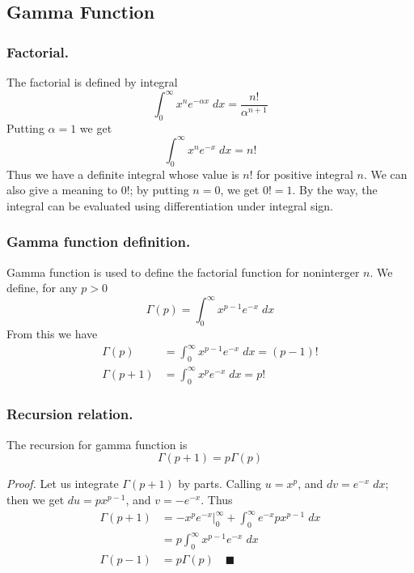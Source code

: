 \documentclass[../main.tex]{subfiles}
\begin{document}
\subsection*{Gamma Function}
\subsubsection*{Factorial.} The factorial is defined by integral
\begin{equation*}
    \int_{0}^{\infty} x^ne^{-\alpha x}\;dx=\frac{n!}{\alpha^{n+1}}
\end{equation*}
Putting $\alpha=1$ we get 
\begin{equation*}
    \int_{0}^{\infty} x^ne^{-x}\;dx=n!
\end{equation*}
Thus we have a definite integral whose value is $n!$ for positive integral $n$. We can also give a meaning to $0!$; by putting $n=0$, we get $0!=1$. By the way, the integral can be evaluated using differentiation under integral sign. 

\subsubsection*{Gamma function definition.} Gamma function is used to define the factorial function for noninterger $n$. We define, for any $p > 0$
\begin{equation*}
    \Gamma(p)=\int_{0}^{\infty} x^{p-1}e^{-  x}\;dx
\end{equation*}
From this we have 
\begin{align*}
    \Gamma(p)&=\int_{0}^{\infty} x^{p-1}e^{-  x}\;dx=(p-1)!\\
    \Gamma(p+1)&=\int_{0}^{\infty} x^{p}e^{-  x}\;dx=p!
\end{align*}

\subsubsection*{Recursion relation.} The recursion for gamma function is 
\begin{equation*}
    \Gamma(p+1)=p\Gamma(p)
\end{equation*}

\emph{Proof.} Let us integrate $\Gamma(p+1)$ by parts. Calling $u=x^p$, and $ dv=e^{-x}\;dx$; then we get $du=px^{p-1}$, and $v=-e^{-x}$. Thus 
\begin{align*}
    \Gamma(p+1)&=-x^pe^{-x}\bigg|_0^{\infty}+\int_{0}^{\infty}e^{-x}px^{p-1}\;dx\\
    &=p\int_{0}^{\infty}x^{p-1}e^{-x}\;dx\\
    \Gamma(p-1)&=p\Gamma(p)\quad\blacksquare
\end{align*}
\end{document}
